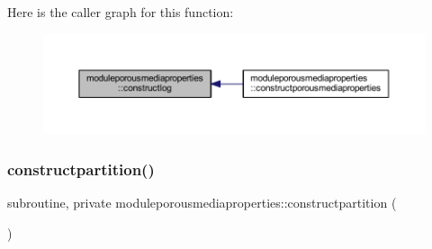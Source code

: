 Here is the caller graph for this function\+:\nopagebreak
\begin{figure}[H]
\begin{center}
\leavevmode
\includegraphics[width=350pt]{namespacemoduleporousmediaproperties_a2bfe4b92207b55cc4167ccce04ea859f_icgraph}
\end{center}
\end{figure}
\mbox{\label{namespacemoduleporousmediaproperties_a61c528a081f6e7bd050ab2482d187fe5}} 
\subsubsection{\texorpdfstring{constructpartition()}{constructpartition()}}
{\footnotesize\ttfamily subroutine, private moduleporousmediaproperties\+::constructpartition (\begin{DoxyParamCaption}{ }\end{DoxyParamCaption})\hspace{0.3cm}{\ttfamily [private]}}

